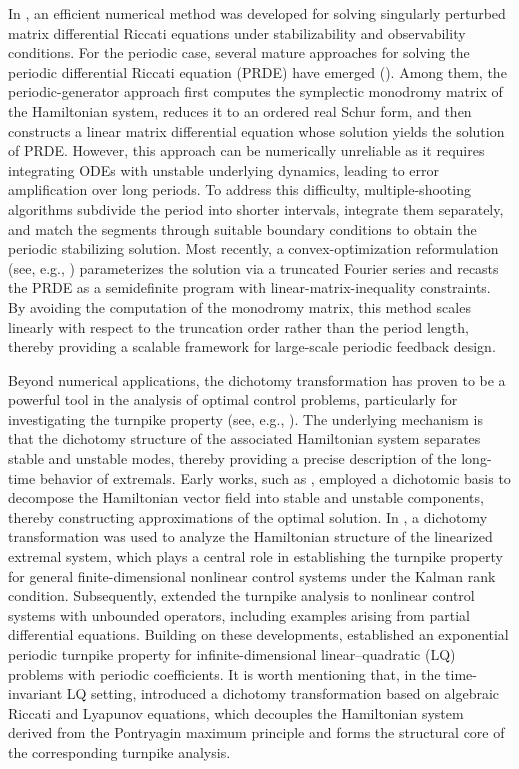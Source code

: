 \documentclass{IEEEtran}
\begin{document}
	In \cite{GG}, an efficient numerical method was developed for solving singularly perturbed matrix differential Riccati equations under stabilizability and observability conditions.
	For the periodic case, several mature approaches for solving the periodic differential Riccati equation (PRDE) have emerged (\cite{GJKSV10,V}).
	Among them, the periodic-generator approach first computes the symplectic monodromy matrix of the Hamiltonian system, reduces it to an ordered real Schur form, and then constructs a linear matrix differential equation whose solution yields the solution of PRDE.
	However, this approach can be numerically unreliable as it requires integrating ODEs with unstable underlying dynamics, leading to error amplification over long periods.
	To address this difficulty, multiple-shooting algorithms subdivide the period into shorter intervals, integrate them separately, and match the segments through suitable boundary conditions to obtain the periodic stabilizing solution.
	Most recently, a convex-optimization reformulation (see, e.g., \cite{GJKSV10}) parameterizes the solution via a truncated Fourier series and recasts the PRDE as a semidefinite program with linear-matrix-inequality constraints. 
	By avoiding the computation of the monodromy matrix, this method scales linearly with respect to the truncation order rather than the period length, thereby providing a scalable framework for large-scale periodic feedback design.
	
	Beyond numerical applications, the dichotomy transformation has proven to be a powerful tool in the analysis of optimal control problems, particularly for investigating the turnpike property (see, e.g., \cite{WK, TZZ, TZ}).
	The underlying mechanism is that the dichotomy structure of the associated Hamiltonian system separates stable and unstable modes, thereby providing a precise description of the long-time behavior of extremals.
	Early works, such as \cite{RM}, employed a dichotomic basis to decompose the Hamiltonian vector field into stable and unstable components, thereby constructing approximations of the optimal solution.
	In \cite{TZ}, a dichotomy transformation was used to analyze the Hamiltonian structure of the linearized extremal system, which plays a central role in establishing the turnpike property for general finite-dimensional nonlinear control systems under the Kalman rank condition.
	Subsequently, \cite{TZZ} extended the turnpike analysis to nonlinear control systems with unbounded operators, including examples arising from partial differential equations.
	Building on these developments, \cite{TZZ2} established an exponential periodic turnpike property for infinite-dimensional linear–quadratic (LQ) problems with periodic coefficients.
	It is worth mentioning that, in the time-invariant LQ setting, \cite[Lemma 1]{TZZ} introduced a dichotomy transformation based on algebraic Riccati and Lyapunov equations, which decouples the Hamiltonian system derived from the Pontryagin maximum principle and forms the structural core of the corresponding turnpike analysis.
	
\end{document}
